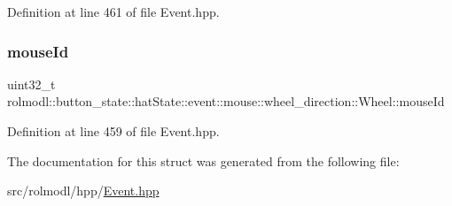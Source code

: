 Definition at line 461 of file Event.\+hpp.

\mbox{\label{structrolmodl_1_1button__state_1_1hat_state_1_1event_1_1mouse_1_1wheel__direction_1_1_wheel_a90537ea1017c03985861ac60bb2e7a8c}} 
\subsubsection{\texorpdfstring{mouseId}{mouseId}}
{\footnotesize\ttfamily uint32\+\_\+t rolmodl\+::button\+\_\+state\+::hat\+State\+::event\+::mouse\+::wheel\+\_\+direction\+::\+Wheel\+::mouse\+Id}



Definition at line 459 of file Event.\+hpp.



The documentation for this struct was generated from the following file\+:\begin{DoxyCompactItemize}
\item 
src/rolmodl/hpp/\mbox{\hyperlink{_event_8hpp}{Event.\+hpp}}\end{DoxyCompactItemize}

